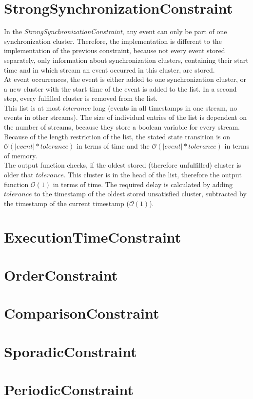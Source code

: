 \section{StrongSynchronizationConstraint}
	In the \emph{StrongSynchronizationConstraint}, any event can only be part of one synchronization cluster. Therefore, the implementation is different to the implementation of the previous constraint, because not every event stored separately, only information about synchronization clusters, containing their start time and in which stream an event occurred in this cluster, are stored.\\
	At event occurrences, the event is either added to one synchronization cluster, or a new cluster with the start time of the event is added to the list. In a second step, every fulfilled cluster is removed from the list.\\
	This list is at most $tolerance$ long (events in all timestamps in one stream, no events in other streams). The size of individual entries of the list is dependent on the number of streams, because they store a boolean variable for every stream. Because of the length restriction of the list, the stated state transition is on $\mathcal{O}(|event|*tolerance)$ in terms of time and the $\mathcal{O}(|event|*tolerance)$ in terms of memory.\\
	The output function checks, if the oldest stored (therefore unfulfilled) cluster is older that $tolerance$. This cluster is in the head of the list, therefore the output function $\mathcal{O}(1)$ in terms of time. The required delay is calculated by adding $tolerance$ to the timestamp of the oldest stored unsatisfied cluster, subtracted by the timestamp of the current timestamp ($\mathcal{O}(1)$). 
	
\section{ExecutionTimeConstraint}
\section{OrderConstraint}
\section{ComparisonConstraint}
\section{SporadicConstraint}
\section{PeriodicConstraint}
